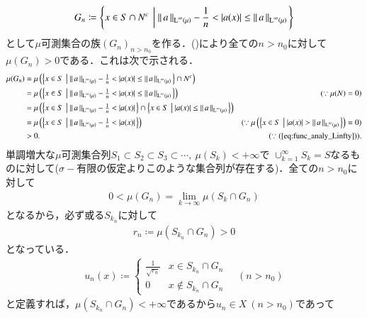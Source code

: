 \begin{prf}
\begin{description}
		\begin{align}
			G_n \coloneqq \left\{ x \in S \cap N^c\ \left|\ \Norm{a}{\Lp{\infty}{\mu}}-\frac{1}{n} < |a(x)| \leq \Norm{a}{\Lp{\infty}{\mu}} \right.\right\}
		\end{align}
		として$\mu$可測集合の族$(G_n)_{n>n_0}$を作る．()により全ての$n > n_0$に対して
		$\mu(G_n) > 0$である．これは次で示される．
		\begin{align}
			\mu(G_n) &= \mu\left(\left\{x \in S\ \left|\ \Norm{a}{\Lp{\infty}{\mu}}-\tfrac{1}{n} < |a(x)| \leq \Norm{a}{\Lp{\infty}{\mu}}\right.\right\} \cap N^c\right) \\
			&= \mu\left(\left\{x \in S\ \left|\ \Norm{a}{\Lp{\infty}{\mu}}-\tfrac{1}{n} < |a(x)| \leq \Norm{a}{\Lp{\infty}{\mu}}\right.\right\}\right) & (\because \mu(N)=0) \\
			&= \mu\left(\left\{x \in S\ \left|\ \Norm{a}{\Lp{\infty}{\mu}}-\tfrac{1}{n} < |a(x)|\right.\right\} \cap \left\{x \in S\ \left|\ |a(x)| \leq \Norm{a}{\Lp{\infty}{\mu}}\right.\right\}\right) \\
			&= \mu\left(\left\{x \in S\ \left|\ \Norm{a}{\Lp{\infty}{\mu}}-\tfrac{1}{n} < |a(x)|\right.\right\}\right) & (\because \mu\left(\left\{x \in S\ \left|\ |a(x)| > \Norm{a}{\Lp{\infty}{\mu}}\right.\right\}\right) = 0) \\
			&> 0. & (\because (\refeq{eq:func_analy_Linfty})).
 		\end{align}
		単調増大な$\mu$可測集合列$S_1 \subset S_2 \subset S_3 \subset \cdots ,\ \mu(S_k) < +\infty$で
		$\cup_{k=1}^{\infty}S_k = S$なるものに対して($\sigma-$有限の仮定よりこのような集合列が存在する)．全ての$n > n_0$に対して
		\begin{align}
			0 < \mu(G_n) = \lim_{k \to \infty} \mu(S_k \cap G_n)
		\end{align}
		となるから，必ず或る$S_{k_n}$に対して
		\begin{align}
			r_n \coloneqq \mu(S_{k_n} \cap G_n) > 0
		\end{align}
		となっている．
		\begin{align}
			u_n(x) \coloneqq 
			\begin{cases}
				\frac{1}{\sqrt{r_n}} & x \in S_{k_n} \cap G_n \\
				0 & x \notin S_{k_n} \cap G_n
			\end{cases}
			\quad (n > n_0)
		\end{align}
		と定義すれば，$\mu(S_{k_n} \cap G_n) < +\infty$であるから$u_n \in X\ (n > n_0)$であって
		\begin{align}

\end{align}
\end{description}
\end{prf}
